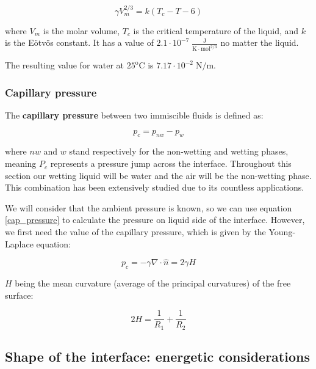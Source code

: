 \begin{equation} 
\gamma V_m^{2/3}=k\left(T_{c}-T-6\right)
\label{eotvos}
\end{equation}

where $V_m$ is the molar volume, $T_c$ is the critical temperature of the liquid, and $k$ is the Eötvös constant. It has a value of $2.1\cdot 10^{-7} \; \frac{\textrm{J}}{\textrm{K} \cdot \textrm{mol}^{\textrm{2/3}}}$ no matter the liquid.

The resulting value for water at $25^\textrm{o} \textrm{C}$ is $7.17 \cdot 10^{-2} \; \textrm{N/m}$.

\subsubsection{Capillary pressure}

The \textbf{capillary pressure} between two immiscible fluids is defined as:

\begin{equation} 
	p_c = p_{nw} - p_{w}
	\label{cap_pressure}
\end{equation}

where $nw$ and $w$ stand respectively for the non-wetting and wetting phases, meaning $P_c$ represents a pressure jump across the interface. Throughout this section our wetting liquid will be water and the air will be the non-wetting phase. This combination has been extensively studied due to its countless applications.

We will consider that the ambient pressure is known, so we can use equation \ref{cap_pressure} to calculate the pressure on liquid side of the interface. However, we first need the value of the capillary pressure, which is given by the Young-Laplace equation:

\begin{equation} 
p_c = -\gamma \nabla \cdot \hat{n} = 2 \gamma H
\label{young_laplace}
\end{equation}

$H$ being the mean curvature (average of the principal curvatures) of the free surface:

\begin{equation} 
2H = \frac{1}{R_1} + \frac{1}{R_2}
\label{curvature}
\end{equation}

\subsection{Shape of the interface: energetic considerations}

